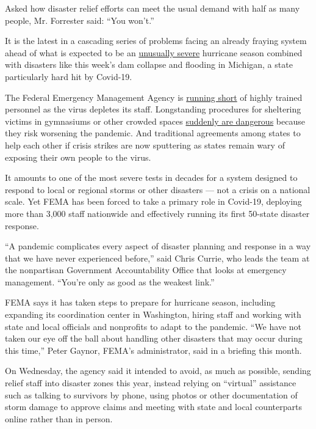 Asked how disaster relief efforts can meet the usual demand with half as
many people, Mr. Forrester said: ``You won't.''

It is the latest in a cascading series of problems facing an already
fraying system ahead of what is expected to be an
\href{https://www.nytimes3xbfgragh.onion/2020/05/21/climate/hurricane-season-2020-noaa.html}{unusually
severe} hurricane season combined with disasters like this week's dam
collapse and flooding in Michigan, a state particularly hard hit by
Covid-19.

The Federal Emergency Management Agency is
\href{https://www.nytimes3xbfgragh.onion/2020/04/03/climate/fema-staff-shortage-coronavirus.html}{running
short} of highly trained personnel as the virus depletes its staff.
Longstanding procedures for sheltering victims in gymnasiums or other
crowded spaces
\href{https://www.nytimes3xbfgragh.onion/2020/03/21/climate/virus-fema-disaster-aid-shelter.html}{suddenly
are dangerous} because they risk worsening the pandemic. And traditional
agreements among states to help each other if crisis strikes are now
sputtering as states remain wary of exposing their own people to the
virus.

It amounts to one of the most severe tests in decades for a system
designed to respond to local or regional storms or other disasters ---
not a crisis on a national scale. Yet FEMA has been forced to take a
primary role in Covid-19, deploying more than 3,000 staff nationwide and
effectively running its first 50-state disaster response.

``A pandemic complicates every aspect of disaster planning and response
in a way that we have never experienced before,'' said Chris Currie, who
leads the team at the nonpartisan Government Accountability Office that
looks at emergency management. ``You're only as good as the weakest
link.''

FEMA says it has taken steps to prepare for hurricane season, including
expanding its coordination center in Washington, hiring staff and
working with state and local officials and nonprofits to adapt to the
pandemic. ``We have not taken our eye off the ball about handling other
disasters that may occur during this time,'' Peter Gaynor, FEMA's
administrator, said in a briefing this month.

On Wednesday, the agency said it intended to avoid, as much as possible,
sending relief staff into disaster zones this year, instead relying on
``virtual'' assistance such as talking to survivors by phone, using
photos or other documentation of storm damage to approve claims and
meeting with state and local counterparts online rather than in person.

